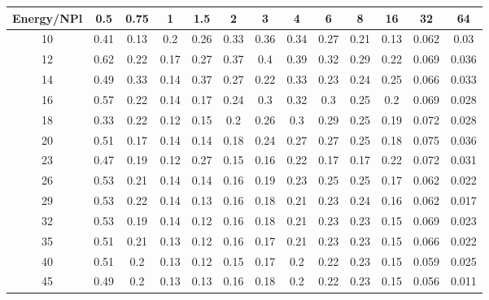 \begin{tabular}{c c c c c c c c c c c c c}
\hline
\hline
 Energy/NPl &    0.5 &   0.75 &      1 &    1.5 &      2 &      3 &      4 &      6 &      8 &     16 &     32 &     64  \\ 
\hline
    10  &   0.41  &   0.13  &    0.2  &   0.26  &   0.33  &   0.36  &   0.34  &   0.27  &   0.21  &   0.13  &  0.062  &   0.03  \\
    12  &   0.62  &   0.22  &   0.17  &   0.27  &   0.37  &    0.4  &   0.39  &   0.32  &   0.29  &   0.22  &  0.069  &  0.036  \\
    14  &   0.49  &   0.33  &   0.14  &   0.37  &   0.27  &   0.22  &   0.33  &   0.23  &   0.24  &   0.25  &  0.066  &  0.033  \\
    16  &   0.57  &   0.22  &   0.14  &   0.17  &   0.24  &    0.3  &   0.32  &    0.3  &   0.25  &    0.2  &  0.069  &  0.028  \\
    18  &   0.33  &   0.22  &   0.12  &   0.15  &    0.2  &   0.26  &    0.3  &   0.29  &   0.25  &   0.19  &  0.072  &  0.028  \\
    20  &   0.51  &   0.17  &   0.14  &   0.14  &   0.18  &   0.24  &   0.27  &   0.27  &   0.25  &   0.18  &  0.075  &  0.036  \\
    23  &   0.47  &   0.19  &   0.12  &   0.27  &   0.15  &   0.16  &   0.22  &   0.17  &   0.17  &   0.22  &  0.072  &  0.031  \\
    26  &   0.53  &   0.21  &   0.14  &   0.14  &   0.16  &   0.19  &   0.23  &   0.25  &   0.25  &   0.17  &  0.062  &  0.022  \\
    29  &   0.53  &   0.22  &   0.14  &   0.13  &   0.16  &   0.18  &   0.21  &   0.23  &   0.24  &   0.16  &  0.062  &  0.017  \\
    32  &   0.53  &   0.19  &   0.14  &   0.12  &   0.16  &   0.18  &   0.21  &   0.23  &   0.23  &   0.15  &  0.069  &  0.023  \\
    35  &   0.51  &   0.21  &   0.13  &   0.12  &   0.16  &   0.17  &   0.21  &   0.23  &   0.23  &   0.15  &  0.066  &  0.022  \\
    40  &   0.51  &    0.2  &   0.13  &   0.12  &   0.15  &   0.17  &    0.2  &   0.22  &   0.23  &   0.15  &  0.059  &  0.025  \\
    45  &   0.49  &    0.2  &   0.13  &   0.13  &   0.16  &   0.18  &    0.2  &   0.22  &   0.23  &   0.15  &  0.056  &  0.011  \\
\hline
\hline
\end{tabular}
